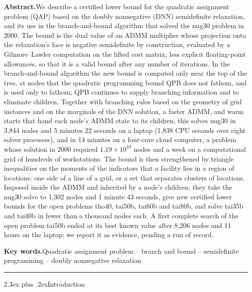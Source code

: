 \documentclass[10pt]{article}
\makeatletter
\renewcommand\section{\@startsection{section}{1}{\z@}{-3.5ex plus -1ex minus -.2ex}%
  {2.3ex plus .2ex}{\normalfont\normalsize\bfseries}}
\theoremstyle{remark}
\makeatother
\begin{document}
\vspace{14pt}
{\small\noindent\textbf{Abstract.}\enspace We describe a certified lower bound for the quadratic assignment problem (QAP)
based on the doubly nonnegative (DNN) semidefinite relaxation, and its use in the
branch-and-bound algorithm that solved the nug30 problem in 2000. The bound is the
dual value of an ADMM multiplier whose projection onto the relaxation's face is
negative semidefinite by construction, evaluated by a Gilmore--Lawler computation
on the lifted cost matrix, less explicit floating-point allowances, so that it is
a valid bound after any number of iterations. In the branch-and-bound algorithm
the new bound is computed only near the top of the tree, at nodes that the
quadratic programming bound QPB does not fathom, and is used only to fathom; QPB
continues to supply branching information and to eliminate children. Together with
branching rules based on the geometry of grid instances and on the marginals of the
DNN solution, a faster ADMM, and warm starts that hand each node's ADMM state to its
children, this solves nug30 in 3,844 nodes and 5 minutes 22 seconds on a laptop
(1,838 CPU seconds over eight solver processes), and in 14 minutes on a four-core
cloud computer, a problem whose
solution in 2000 required $1.19\times10^{10}$ nodes and a week on a computational
grid of hundreds of workstations. The bound is then strengthened by triangle
inequalities on the moments of the indicators that a facility lies in a region of
locations: one side of a line of a grid, or a set that separates clusters of
locations. Imposed inside the ADMM and inherited by a node's children, they take
the nug30 solve to 1,302 nodes and 1 minute 43 seconds, give new certified lower
bounds for the open problems tho40, tai50b, tai60b and tai80b, and solve tai35b and
tai40b in fewer than a thousand nodes each. A first complete search of the open
problem tai50b ended at its best known value after 8,206 nodes and 11 hours on the
laptop; we report it as evidence, pending a run of record.

\vspace{8pt}
\noindent\textbf{Key words.}\enspace Quadratic assignment problem -- branch and bound --
semidefinite programming -- doubly nonnegative relaxation\par}

\vspace{10pt}
\noindent\rule{\textwidth}{0.4pt}
\vspace{2pt}

\section{Introduction}
\end{document}
